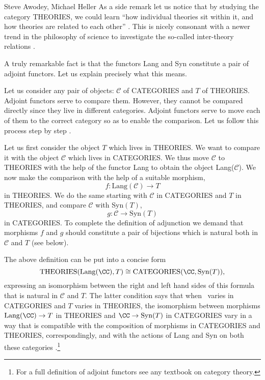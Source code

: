 \begin{artengenv2auth}{Steve Awodey, Michael Heller}
As a side remark let us notice that by studying the category THEORIES, we could learn ``how individual theories sit within it, and how theories are related to each other'' \parencite[p.413]{Halvorson2017}. This is nicely consonant with a newer trend in the philosophy of science to investigate the so-called inter-theory relations \parencite{Batterman,Rosaler}.

A truly remarkable fact is that the functors Lang and Syn constitute a pair of adjoint functors. Let us explain precisely what this means.

Let us consider any pair of objects: $\mathcal{C}$ of CATEGORIES and $T$ of THEORIES. Adjoint functors serve to compare them. However, they cannot be compared directly since they live in different categories. Adjoint functors serve to move each of them to the correct category so as to enable the comparison. Let us follow this process step by step \parencite[pp.148-153]{Simmons}.

Let us first consider the object $T$ which lives in THEORIES. We want to compare it with the object $\mathcal{C}$ which lives in CATEGORIES. We thus move $\mathcal{C}$ to THEORIES with the help of the functor Lang to obtain the object Lang($\mathcal{C}$). We now make the comparison with the help of a suitable morphism,
$$
f: \mathrm{Lang}(\mathcal{C}) \to T
$$
in THEORIES. We do the same starting with $\mathcal{C}$ in CATEGORIES and $T$ in THEORIES, and compare $\mathcal{C}$ with Syn$(T)$, 
$$
g: \mathcal{C} \to \mathrm{Syn}(T)
$$
in CATEGORIES. To complete the definition of adjunction we demand that morphisms $f$ and $g$ should constitute a pair of bijections which is natural both in $\mathcal{C}$ and $T$ (see below).

The above definition can be put into a concise form
\begin{equation}
\label{hom1}
\mathrm{THEORIES}(\mathrm{Lang}(\CC ), T) \cong {\mathrm{CATEGORIES}}(\CC , \mathrm{Syn}(T)),
\end{equation}
expressing an isomorphism between the right and left hand sides of this formula that is natural in $\mathcal{C}$ and $T$. The latter condition says that when \CC \ varies in CATEGORIES and $T$ varies in THEORIES, the isomorphism between morphisms $\mathrm{Lang}(\CC ) \to T$ in THEORIES and $\CC \to \mathrm{Syn}(T)$ in CATEGORIES vary in a way that is compatible with the composition of morphisms in CATEGORIES and THEORIES, correspondingly, and with the actions of Lang and Syn on both these categories \parencites[see][]{AF}[][pp.50-51]{Leinster}.\footnote{For a full definition of adjoint functors see any textbook on category theory.}


\end{artengenv2auth}
